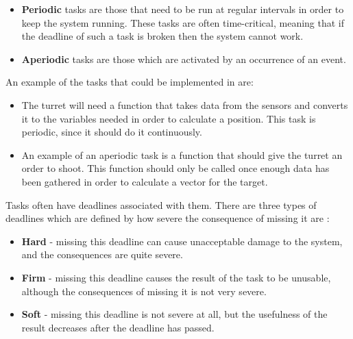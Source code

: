 \begin{itemize}
  \item \textbf{Periodic} tasks are those that need to be run at regular
  intervals in order to keep the system running. These tasks are often
  time-critical, meaning that if the deadline of such a task is broken then the
  system cannot work.
  \item \textbf{Aperiodic} tasks are those which are activated by an occurrence
  of an event.
\end{itemize}

An example of the tasks that could be implemented in \name are:
\begin{itemize}
  \item The turret will need a function that takes data from the sensors and
  converts it to the variables needed in order to calculate a position. This
  task is periodic, since it should do it continuously.
  \item An example of an aperiodic task is a function that should give the
  turret an order to shoot. This function should only be called once enough data has
  been gathered in order to calculate a vector for the target.
\end{itemize}

Tasks often have deadlines associated with them. There are three types of
deadlines which are defined by how severe the consequence of missing it are
\citep[ch.1A]{Realtime}:

\begin{itemize}
  \item \textbf{Hard} - missing this deadline can cause unacceptable damage
  to the system, and the consequences are quite severe.
  \item \textbf{Firm} - missing this deadline causes the result of the task to
  be unusable, although the consequences of missing it is not very severe.
  \item \textbf{Soft} - missing this deadline is not severe at all, but the
  usefulness of the result decreases after the deadline has passed.
\end{itemize}


